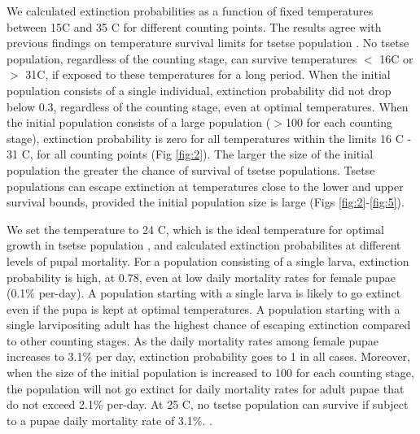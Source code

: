 \documentclass[smallextended]{svjour3}
\begin{document}
We calculated extinction probabilities as a function of fixed temperatures between 15\degree C and 35 \degree C for different counting points. The results agree with previous findings on temperature survival limits for tsetse population \cite{Edney1962,Kleynhans2011e,Pagabeleguem2016f,Are2019}. No tsetse population, regardless of the counting stage, can survive temperatures $<$ 16\degree C or $>$ 31\degree C, if exposed to these temperatures for a long period. When the initial population consists of a single individual, extinction probability did not drop below 0.3, regardless of the counting stage, even at optimal temperatures. When the initial population consists of a large population ($>$100 for each counting stage), extinction probability is zero for all temperatures within the limits 16 \degree C - 31 \degree  C, for all counting points (Fig \ref{fig:2}). The larger the size of the initial population the greater the chance of survival of tsetse populations. Tsetse populations can escape extinction at temperatures close to the lower and upper survival bounds, provided the initial population size is large (Figs \ref{fig:2}-\ref{fig:5}).

We set the temperature to 24 \degree C, which is the ideal temperature for optimal growth in tsetse population
\cite{Pagabeleguem2016f,Are2019}, and calculated extinction probabilites at different levels of pupal mortality. For a population consisting of a single larva, extinction probability is high, at 0.78, even at low daily mortality rates for female pupae (0.1\% per-day). A population starting with a single larva is likely to go extinct even if the pupa is kept at optimal temperatures. A population starting with a single larvipositing adult has the highest chance of escaping extinction compared to other counting stages. As the daily mortality rates among female pupae increases to 3.1\% per day, extinction probability goes to 1 in all cases. Moreover, when the size of the initial population is increased to 100 for each counting stage, the population will not go extinct for daily mortality rates for adult pupae that do not exceed 2.1\% per-day. At 25 \degree C, no tsetse population can survive if subject to a pupae daily mortality rate of 3.1\%. \cite{Hargrove2019a}. 
\end{document}

